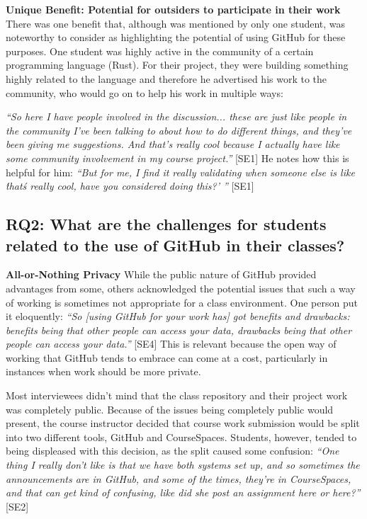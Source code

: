 \textbf{Unique Benefit: Potential for outsiders to participate in their work} \break
There was one benefit that, although was mentioned by only one student, was noteworthy to consider as highlighting the potential of using GitHub for these purposes. One student was highly active in the community of a certain programming language (Rust). For their project, they were building something highly related to the language and therefore he advertised his work to the community, who would go on to help his work in multiple ways:

\textit{``So here I have people involved in the discussion... these are just like people in the community I've been talking to about how to do different things, and they've been giving me suggestions. And that's really cool because I actually have like some community involvement in my course project.''} [SE1] He notes how this is helpful for him: \textit{``But for me, I find it really validating when someone else is like \'that\'s really cool, have you considered doing this?' ''} [SE1]

\subsection{RQ2: What are the challenges for students related to the use of GitHub in their classes?}
\textbf{All-or-Nothing Privacy} \break
While the public nature of GitHub provided advantages from some, others acknowledged the potential issues that such a way of working is sometimes not appropriate for a class environment. One person put it eloquently: \textit{``So [using GitHub for your work has] got benefits and drawbacks: benefits being that other people can access your data, drawbacks being that other people can access your data.''} [SE4] This is relevant because the open way of working that GitHub tends to embrace can come at a cost, particularly in instances when work should be more private.

Most interviewees didn't mind that the class repository and their project work was completely public. Because of the issues being completely public would present, the course instructor decided that course work submission would be split into two different tools, GitHub and CourseSpaces. Students, however, tended to being displeased with this decision, as the split caused some confusion: \textit{``One thing I really don't like is that we have both systems set up, and so sometimes the announcements are in GitHub, and some of the times, they're in CourseSpaces, and that can get kind of confusing, like did she post an assignment here or here?''} [SE2]

